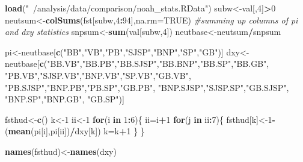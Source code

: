 \documentclass[]{article}
\newenvironment{Shaded}{\begin{snugshade}}{\end{snugshade}}
\newcommand{\KeywordTok}[1]{\textcolor[rgb]{0.13,0.29,0.53}{\textbf{#1}}}
\newcommand{\DataTypeTok}[1]{\textcolor[rgb]{0.13,0.29,0.53}{#1}}
\newcommand{\DecValTok}[1]{\textcolor[rgb]{0.00,0.00,0.81}{#1}}
\newcommand{\StringTok}[1]{\textcolor[rgb]{0.31,0.60,0.02}{#1}}
\newcommand{\CommentTok}[1]{\textcolor[rgb]{0.56,0.35,0.01}{\textit{#1}}}
\newcommand{\OtherTok}[1]{\textcolor[rgb]{0.56,0.35,0.01}{#1}}
\newcommand{\ControlFlowTok}[1]{\textcolor[rgb]{0.13,0.29,0.53}{\textbf{#1}}}
\newcommand{\OperatorTok}[1]{\textcolor[rgb]{0.81,0.36,0.00}{\textbf{#1}}}
\newcommand{\NormalTok}[1]{#1}
\begin{document}
\begin{Shaded}
\begin{Highlighting}[]
\KeywordTok{load}\NormalTok{(}\StringTok{"~/analysis/data/comparison/noah_stats.RData"}\NormalTok{)}
\NormalTok{subw<-val[,}\DecValTok{4}\NormalTok{]}\OperatorTok{>}\DecValTok{0}
\NormalTok{neutsum<-}\KeywordTok{colSums}\NormalTok{(fst[subw,}\DecValTok{4}\OperatorTok{:}\DecValTok{94}\NormalTok{],}\DataTypeTok{na.rm=}\OtherTok{TRUE}\NormalTok{) }\CommentTok{#summing up columns of pi and dxy statistics}
\NormalTok{snpsum<-}\KeywordTok{sum}\NormalTok{(val[subw,}\DecValTok{4}\NormalTok{])}
\NormalTok{neutbase<-neutsum}\OperatorTok{/}\NormalTok{snpsum}

\NormalTok{pi<-neutbase[}\KeywordTok{c}\NormalTok{(}\StringTok{"BB"}\NormalTok{,}\StringTok{"VB"}\NormalTok{,}\StringTok{"PB"}\NormalTok{,}\StringTok{"SJSP"}\NormalTok{,}\StringTok{"BNP"}\NormalTok{,}\StringTok{"SP"}\NormalTok{,}\StringTok{"GB"}\NormalTok{)]}
\NormalTok{dxy<-neutbase[}\KeywordTok{c}\NormalTok{(}\StringTok{"BB.VB"}\NormalTok{,}\StringTok{"BB.PB"}\NormalTok{,}\StringTok{"BB.SJSP"}\NormalTok{,}\StringTok{"BB.BNP"}\NormalTok{,}\StringTok{"BB.SP"}\NormalTok{,}\StringTok{"BB.GB"}\NormalTok{,}
                \StringTok{"PB.VB"}\NormalTok{,}\StringTok{"SJSP.VB"}\NormalTok{,}\StringTok{"BNP.VB"}\NormalTok{,}\StringTok{"SP.VB"}\NormalTok{,}\StringTok{"GB.VB"}\NormalTok{,}
                \StringTok{"PB.SJSP"}\NormalTok{,}\StringTok{"BNP.PB"}\NormalTok{,}\StringTok{"PB.SP"}\NormalTok{,}\StringTok{"GB.PB"}\NormalTok{,}
                \StringTok{"BNP.SJSP"}\NormalTok{,}\StringTok{"SJSP.SP"}\NormalTok{,}\StringTok{"GB.SJSP"}\NormalTok{,}
                \StringTok{"BNP.SP"}\NormalTok{,}\StringTok{"BNP.GB"}\NormalTok{,}
                \StringTok{"GB.SP"}\NormalTok{)]}

\NormalTok{fsthud<-}\KeywordTok{c}\NormalTok{()}
\NormalTok{k<-}\DecValTok{1}
\NormalTok{ii<-}\DecValTok{1}
\ControlFlowTok{for}\NormalTok{(i }\ControlFlowTok{in} \DecValTok{1}\OperatorTok{:}\DecValTok{6}\NormalTok{)\{}
\NormalTok{  ii=i}\OperatorTok{+}\DecValTok{1}
  \ControlFlowTok{for}\NormalTok{(j }\ControlFlowTok{in}\NormalTok{ ii}\OperatorTok{:}\DecValTok{7}\NormalTok{)\{}
\NormalTok{  fsthud[k]<-}\DecValTok{1}\OperatorTok{-}\NormalTok{(}\KeywordTok{mean}\NormalTok{(pi[i],pi[ii])}\OperatorTok{/}\NormalTok{dxy[k])}
\NormalTok{  k=k}\OperatorTok{+}\DecValTok{1}
\NormalTok{\}}
\NormalTok{\}}

\KeywordTok{names}\NormalTok{(fsthud)<-}\KeywordTok{names}\NormalTok{(dxy)}


\end{Highlighting}
\end{Shaded}
\end{document}
